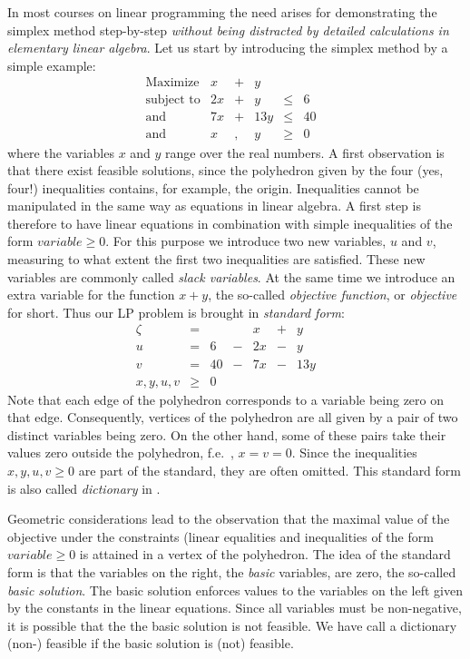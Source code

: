 \documentclass[ukenglish]{nik}
\begin{document}
In most courses on linear programming the need arises for demonstrating the simplex method step-by-step 
\emph{without being distracted by detailed calculations in elementary linear algebra}. Let us start by
introducing the simplex method by a simple example:
\[
    \begin{array}{lrcrcrcrcrcrcr}
    \text{Maximize}  &    x &+&    y \\
    \text{subject to}&  2 x &+&    y &\leq&   6\\
    \text{and}&         7 x &+& 13 y &\leq&  40\\
    \text{and}       &    x &,&    y &\geq&0    &
    \end{array}
\]
where the variables $x$ and $y$ range over the real numbers.
A first observation is that there exist feasible solutions,
since the polyhedron given by the four (yes, four!) inequalities contains,
for example, the origin. Inequalities cannot be manipulated in the same
way as equations in linear algebra. A first step is therefore to
have linear equations in combination with simple inequalities of the form
$\mathit{variable}\geq 0$. For this purpose we introduce
two new variables, $u$ and $v$, measuring to what extent the first
two inequalities are satisfied. These new variables are commonly called
\emph{slack variables}. At the same time we introduce an extra variable
for the function $x+y$, the so-called \emph{objective function},
or \emph{objective} for short. Thus our LP problem is brought in
\emph{standard form}:
\[    
    \begin{array}{lcrcrcrcr}
      \zeta&=&   & &     x &+&     y & &  \\\hline
      u    &=& 6 &-&   2 x &-&     y & &  \\
      v    &=& 40&-&   7 x &-&  13 y & &  \\
      x,y,u,v  &\geq&0     & &  & &  & &    
    \end{array}
\]
Note that each edge of the polyhedron corresponds to a variable
being zero on that edge. Consequently,
vertices of the polyhedron are all given by a pair of
two distinct variables being zero. On the other hand, some of these
pairs take their values zero outside the polyhedron, f.e.\ , $x=v=0$.
Since the inequalities $x,y,u,v \geq 0$ are part of the standard, 
they are often omitted. This standard form is also called \emph{dictionary}
in \cite{Vanderbei}.

Geometric considerations lead to the observation that the
maximal value of the objective under the constraints (linear
equalities and inequalities of the form 
$\mathit{variable}\geq 0$ is attained in a vertex of the
polyhedron. The idea of the standard form is
that the variables on the right, the \emph{basic} variables, are zero,
the so-called \emph{basic solution}.
The basic solution enforces values to the variables on the left
given by the constants in the linear equations.
Since all variables must be non-negative, it is possible that
the the basic solution is not feasible. We have call a dictionary
(non-) feasible if the basic solution is (not) feasible.
\end{document}
